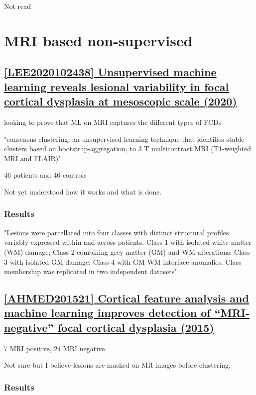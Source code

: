 Not read

\newpage
\section{MRI based non-supervised}
\label{ul}

\subsection{\href{https://www.sciencedirect.com/science/article/pii/S2213158220302758}{[LEE2020102438] Unsupervised machine learning reveals lesional variability in focal cortical dysplasia at mesoscopic scale (2020) }}
\label{ul1}

looking to prove that ML on MRI captures the different types of FCDs

"consensus clustering, an unsupervised learning technique that identifies stable clusters based on bootstrap-aggregation, to 3 T multicontrast MRI (T1-weighted MRI and FLAIR)"

46 patients and 46 controls

Not yet understood how it works and what is done.

\subsubsection{Results}

"Lesions were parcellated into four classes with distinct structural profiles variably expressed within and across patients: Class-1 with isolated white matter (WM) damage; Class-2 combining grey matter (GM) and WM alterations; Class-3 with isolated GM damage; Class-4 with GM-WM interface anomalies. Class membership was replicated in two independent datasets"

\newpage
\subsection{\href{https://www.sciencedirect.com/science/article/pii/S1525505015002322}{[AHMED201521] Cortical feature analysis and machine learning improves detection of “MRI-negative” focal cortical dysplasia (2015) }}
\label{ul2}

7 MRI positive, 24 MRI negative

Not sure but I believe lesions are masked on MR images before clustering.

\subsubsection{Results}

